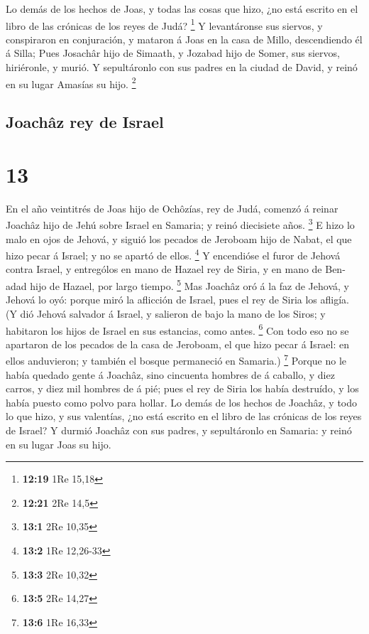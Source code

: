  Lo demás de los hechos de Joas, y todas las cosas que
hizo, ¿no está escrito en el libro de las crónicas de los reyes de Judá?
\footnote{\textbf{12:19} 1Re 15,18}  Y levantáronse sus
siervos, y conspiraron en conjuración, y mataron á Joas en la casa de
Millo, descendiendo él á Silla;  Pues Josachâr hijo de
Simaath, y Jozabad hijo de Somer, sus siervos, hiriéronle, y murió. Y
sepultáronlo con sus padres en la ciudad de David, y reinó en su lugar
Amasías su hijo. \footnote{\textbf{12:21} 2Re 14,5}

\hypertarget{joachuxe2z-rey-de-israel}{%
\subsection{Joachâz rey de Israel}\label{joachuxe2z-rey-de-israel}}

\hypertarget{section-12}{%
\section{13}\label{section-12}}

 En el año veintitrés de Joas hijo de Ochôzías, rey de Judá,
comenzó á reinar Joachâz hijo de Jehú sobre Israel en Samaria; y reinó
diecisiete años. \footnote{\textbf{13:1} 2Re 10,35}  E hizo
lo malo en ojos de Jehová, y siguió los pecados de Jeroboam hijo de
Nabat, el que hizo pecar á Israel; y no se apartó de ellos. \footnote{\textbf{13:2}
  1Re 12,26-33}  Y encendióse el furor de Jehová contra
Israel, y entrególos en mano de Hazael rey de Siria, y en mano de
Ben-adad hijo de Hazael, por largo tiempo. \footnote{\textbf{13:3} 2Re
  10,32}  Mas Joachâz oró á la faz de Jehová, y Jehová lo
oyó: porque miró la aflicción de Israel, pues el rey de Siria los
afligía.  (Y dió Jehová salvador á Israel, y salieron de
bajo la mano de los Siros; y habitaron los hijos de Israel en sus
estancias, como antes. \footnote{\textbf{13:5} 2Re 14,27} 
Con todo eso no se apartaron de los pecados de la casa de Jeroboam, el
que hizo pecar á Israel: en ellos anduvieron; y también el bosque
permaneció en Samaria.) \footnote{\textbf{13:6} 1Re 16,33} 
Porque no le había quedado gente á Joachâz, sino cincuenta hombres de á
caballo, y diez carros, y diez mil hombres de á pié; pues el rey de
Siria los había destruído, y los había puesto como polvo para hollar.
 Lo demás de los hechos de Joachâz, y todo lo que hizo, y
sus valentías, ¿no está escrito en el libro de las crónicas de los reyes
de Israel?  Y durmió Joachâz con sus padres, y sepultáronlo
en Samaria: y reinó en su lugar Joas su hijo.

